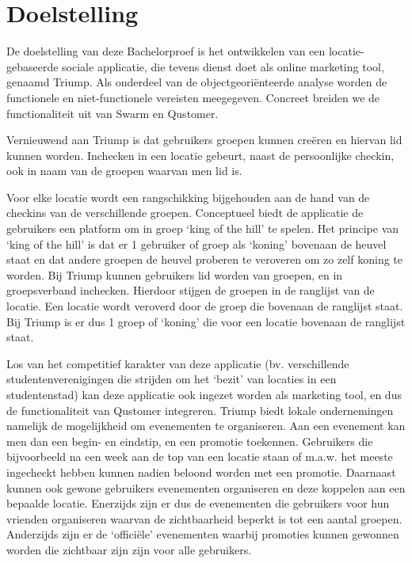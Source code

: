 
\chapter{Doelstelling}

De doelstelling van deze Bachelorproef is het ontwikkelen van een locatie-gebaseerde sociale applicatie, die tevens dienst doet als online marketing tool, genaamd Triump. Als onderdeel van de objectgeoriënteerde analyse worden de functionele en niet-functionele vereisten meegegeven.
Concreet breiden we de functionaliteit uit van Swarm en Qustomer. 

Vernieuwend aan Triump is dat gebruikers groepen kunnen creëren en hiervan lid kunnen worden. Inchecken in een locatie gebeurt, naast de persoonlijke checkin, ook in naam van de groepen waarvan men lid is. 

Voor elke locatie wordt een rangschikking bijgehouden aan de hand van de checkins van de verschillende groepen. Conceptueel biedt de applicatie de gebruikers een platform om in groep `king of the hill' te spelen. Het principe van `king of the hill' is dat er 1 gebruiker of groep als `koning' bovenaan de heuvel staat en dat andere groepen de heuvel proberen te veroveren om zo zelf koning te worden. Bij Triump kunnen gebruikers lid worden van groepen, en in groepsverband inchecken. Hierdoor stijgen de groepen in de ranglijst van de locatie. Een locatie wordt veroverd door de groep die bovenaan de ranglijst staat.
Bij Triump is er dus 1 groep of `koning' die voor een locatie bovenaan de ranglijst staat.

Los van het competitief karakter van deze applicatie (bv. verschillende studentenverenigingen die strijden om het ‘bezit’ van locaties in een studentenstad) kan deze applicatie ook ingezet worden als marketing tool, en dus de functionaliteit van Qustomer integreren.
Triump biedt lokale ondernemingen namelijk de mogelijkheid om evenementen te organiseren. Aan een evenement kan men dan een begin- en eindstip, en een promotie toekennen. Gebruikers die bijvoorbeeld na een week aan de top van een locatie staan of m.a.w. het meeste ingecheckt hebben kunnen nadien beloond worden met een promotie. Daarnaast kunnen ook gewone gebruikers evenementen organiseren en deze koppelen aan een bepaalde locatie.
Enerzijds zijn er dus de evenementen die gebruikers voor hun vrienden organiseren waarvan de zichtbaarheid beperkt is tot een aantal groepen. Anderzijds zijn er de `officiële' evenementen waarbij promoties kunnen gewonnen worden die zichtbaar zijn zijn voor alle gebruikers. 

